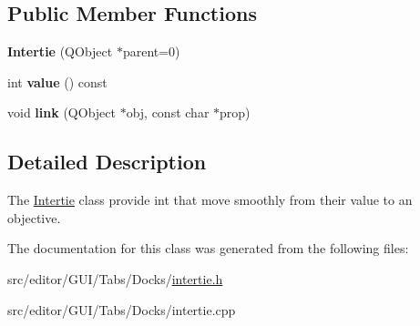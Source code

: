 \subsection*{\-Public \-Member \-Functions}
\begin{DoxyCompactItemize}
\item 
\hypertarget{class_intertie_a5db7f747092208768bc932a15c69fae9}{{\bfseries \-Intertie} (\-Q\-Object $\ast$parent=0)}\label{class_intertie_a5db7f747092208768bc932a15c69fae9}

\item 
\hypertarget{class_intertie_aa30a54fd7c685f48b7d9d178fe6cda6e}{int {\bfseries value} () const }\label{class_intertie_aa30a54fd7c685f48b7d9d178fe6cda6e}

\item 
\hypertarget{class_intertie_a86e5f0e4e5ef985586ccc7596db29c3b}{void {\bfseries link} (\-Q\-Object $\ast$obj, const char $\ast$prop)}\label{class_intertie_a86e5f0e4e5ef985586ccc7596db29c3b}

\end{DoxyCompactItemize}


\subsection{\-Detailed \-Description}
\-The \hyperlink{class_intertie}{\-Intertie} class provide int that move smoothly from their value to an objective. 

\-The documentation for this class was generated from the following files\-:\begin{DoxyCompactItemize}
\item 
src/editor/\-G\-U\-I/\-Tabs/\-Docks/\hyperlink{intertie_8h}{intertie.\-h}\item 
src/editor/\-G\-U\-I/\-Tabs/\-Docks/intertie.\-cpp\end{DoxyCompactItemize}
